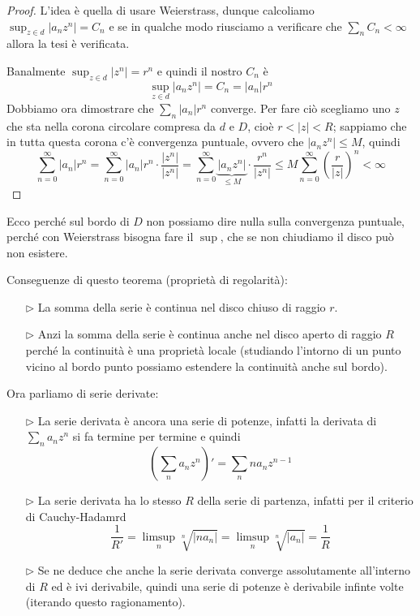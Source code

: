 \begin{proof}
L'idea è quella di usare Weierstrass, dunque calcoliamo $\sup_{z\in d} |a_nz^n|=C_n$ e se in qualche modo riusciamo a verificare che $\sum_n C_n<\infty$ allora la tesi è verificata.

Banalmente $\sup_{z\in d} |z^n|=r^n$ e quindi il nostro $C_n$ è
$$
\sup_{z\in d} |a_nz^n|=C_n=|a_n|r^n
$$
Dobbiamo ora dimostrare che $\sum_n |a_n|r^n $ converge. Per fare ciò scegliamo uno $z$ che sta nella corona circolare compresa da $d$ e $D$, cioè $r<|z|<R$; sappiamo che in tutta questa corona c'è convergenza puntuale, ovvero che $|a_nz^n|\leq M$, quindi
$$
\sum\limits^{\infty}_{n = 0} |a_n|r^n=\sum\limits^{\infty}_{n = 0} |a_n|r^n\cdot\frac{|z^n|}{|z^n|}=\sum\limits^{\infty}_{n = 0} \underbrace{|a_nz^n|}_{\leq M}\cdot\frac{r^n}{|z^n|}\leq M\sum_{n=0}^\infty \left(\frac{r}{|z|}\right)^n<\infty
$$
\end{proof}
\begin{rem}
Ecco perché sul bordo di $D$ non possiamo dire nulla sulla convergenza puntuale, perché con Weierstrass bisogna fare il $\sup$, che se non chiudiamo il disco può non esistere.
\end{rem}

\newpage

Conseguenze di questo teorema (proprietà di regolarità):
\begin{enumerate}
    \item [$\triangleright$] La somma della serie è continua nel disco chiuso di raggio $r$.
    \item [$\triangleright$] Anzi la somma della serie è continua anche nel disco aperto di raggio $R$ perché la continuità è una proprietà locale (studiando l'intorno di un punto vicino al bordo punto possiamo estendere la continuità anche sul bordo). 
\end{enumerate}

Ora parliamo di serie derivate:
\begin{enumerate}
    \item [$\triangleright$] La serie derivata è ancora una serie di potenze, infatti la derivata di $\sum_n a_nz^n$ si fa termine per termine e quindi
    $$
    \left(\sum_n a_nz^n\right)'=\sum_n na_nz^{n-1}
    $$
    \item [$\triangleright$] La serie derivata ha lo stesso $R$ della serie di partenza, infatti per il criterio di Cauchy-Hadamrd
    $$
    \frac{1}{R'}=\limsup_{n}\sqrt[n]{|na_n|}=\limsup_{n}\sqrt[n]{|a_n|}=\frac{1}{R}
    $$
    \item [$\triangleright$] Se ne deduce che anche la serie derivata converge assolutamente all'interno di $R$ ed è ivi derivabile, quindi una serie di potenze è derivabile infinte volte (iterando questo ragionamento).
\end{enumerate}

